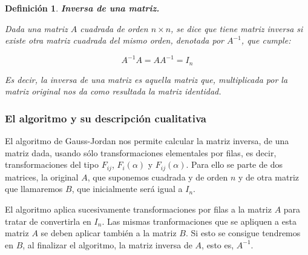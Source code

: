 \documentclass[a4paper,10pt]{article}
\newtheorem{defi}{{Definición}}
\begin{document}
\par \vspace{12pt}

\begin{defi} \textbf{Inversa de una matriz.}\vspace{8pt}\par
Dada una matriz $A$ cuadrada de orden $n \times n$, se dice que tiene \emph{matriz inversa} si existe otra matriz cuadrada del mismo orden, denotada por $A^{-1}$, que cumple:

\par \vspace{10pt}

$$
A^{-1}A=AA^{-1}=I_n
$$

\par \vspace{10pt}

Es decir, la inversa de una matriz es aquella matriz que, multiplicada por la matriz original nos da como resultada la matriz identidad.

\end{defi}

\vspace{12pt}
\subsubsection{El algoritmo y su descripción cualitativa}
\vspace{10pt}

\par \vspace{10pt}

El algoritmo de Gauss-Jordan nos permite calcular la matriz inversa, de una matriz dada, usando sólo transformaciones elementales por filas, es decir, transformaciones del tipo $F_{ij}$, $F_i(\alpha)$ y $F_{ij}(\alpha)$. Para ello se parte de dos matrices, la original $A$, que suponemos cuadrada y de orden $n$ y de otra matriz que llamaremos $B$, que inicialmente será igual a $I_n$.

\par \vspace{10pt}

El algoritmo aplica sucesivamente transformaciones por filas a la matriz $A$ para tratar de convertirla en $I_n$. Las mismas tranformaciones que se apliquen a esta matriz $A$ se deben aplicar también a la matriz $B$. Si esto se consigue tendremos en $B$, al finalizar el algoritmo, la matriz inversa de $A$, esto es, $A^{-1}$.

\par \vspace{10pt}
\end{document}
